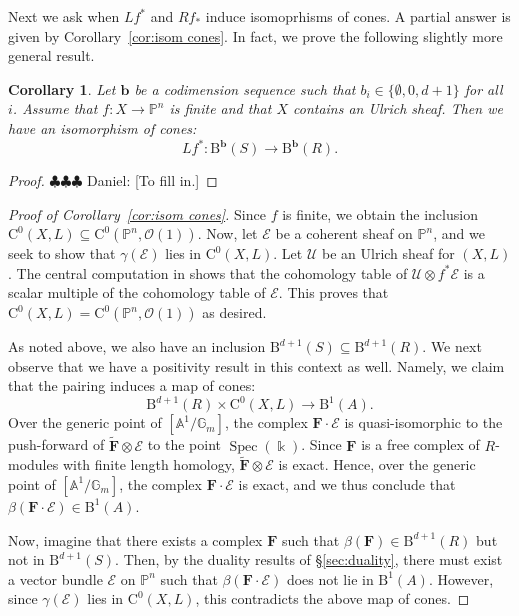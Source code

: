 \documentclass[12pt]{amsart}
\newtheorem{cor}[lemma]{Corollary}
\theoremstyle{definition}
\theoremstyle{remark}
\newcommand{\Spec}{\operatorname{Spec}}
\newcommand{\kk}{\Bbbk}
\newcommand{\PP}{\mathbb{P}}
\renewcommand{\AA}{\mathbb{A}}
\newcommand{\GG}{\mathbb{G}}
\newcommand{\bb}{\mathbf{b}}
\newcommand{\cO}{\mathcal{O}}
\newcommand{\cE}{\mathcal{E}}
\newcommand{\cU}{\mathcal{U}}
\newcommand{\FF}{\mathbf{F}}
\newcommand{\CQ}{\mathrm{C}}
\newcommand{\BBQ}{\mathrm{B}}
\newcommand{\daniel}[1]{{\color{green} \sf $\clubsuit\clubsuit\clubsuit$ Daniel: [#1]}}
\begin{document}
%
Next we ask when $Lf^*$ and $Rf_*$ induce isomoprhisms of cones.  A partial answer is given by Corollary~\ref{cor:isom cones}.  In fact,
we prove the following slightly more general result.

\begin{cor}\label{cor:new graded rings}
Let $\bb$ be a codimension sequence such that $b_i\in \{\emptyset, 0,d+1\}$ for all $i$.  Assume that $f: X\to \PP^n$ is finite and that $X$ contains an Ulrich sheaf.  Then we have an isomorphism of cones:
\[
Lf^*: \BBQ^{\bb}(S)\to \BBQ^{\bb}(R).
\]
\end{cor}
\begin{proof}
\daniel{To fill in.}
\end{proof}



\begin{proof}[Proof of Corollary~\ref{cor:isom cones}]
Since $f$ is finite, we obtain the inclusion $\CQ^0(X,L)\subseteq \CQ^0(\PP^n,\cO(1))$.  Now, let $\cE$ be a coherent sheaf on $\PP^n$, and we seek to show that $\gamma(\cE)$ lies in $\CQ^0(X,L)$.  Let $\cU$ be an Ulrich sheaf for $(X,L)$.  The central computation in \cite[Proof of Theorem 5]{eis-schrey-abel} shows that the cohomology table of $\cU\otimes f^*\cE$ is a scalar multiple of the cohomology table of $\cE$. This proves that $\CQ^0(X,L)= \CQ^0(\PP^n,\cO(1))$ as desired.

As noted above, we also have an inclusion $\BBQ^{d+1}(S)\subseteq \BBQ^{d+1}(R)$.  We next observe that we have a positivity result in this context as well.  Namely, we claim that the pairing induces a map of cones:
\[
\BBQ^{d+1}(R)\times \CQ^0(X,L)\to \BBQ^1(A).
\]
Over the generic point of $[\AA^1/\GG_m]$, the complex $\FF\cdot \cE$ is quasi-isomorphic to the push-forward of $\widetilde{\FF}\otimes \cE$ to the point $\Spec(\kk)$.  Since $\FF$ is a free complex of $R$-modules with finite length homology, $\widetilde{\FF}\otimes \cE$ is exact.  Hence, over the generic point of $[\AA^1/\GG_m]$, the complex $\FF\cdot \cE$ is exact, and we thus conclude that $\beta(\FF\cdot \cE)\in \BBQ^1(A)$.

Now, imagine that  there exists a complex $\FF$ such that $\beta(\FF)\in \BBQ^{d+1}(R)$ but not in $\BBQ^{d+1}(S)$.  Then, by the duality results of \S\ref{sec:duality}, there must exist a vector bundle $\cE$ on $\PP^n$ such that $\beta(\FF\cdot \cE)$ does not lie in $\BBQ^1(A)$.  However, since $\gamma(\cE)$ lies in $\CQ^0(X,L)$, this contradicts the above map of cones.
\end{proof}
\end{document}

